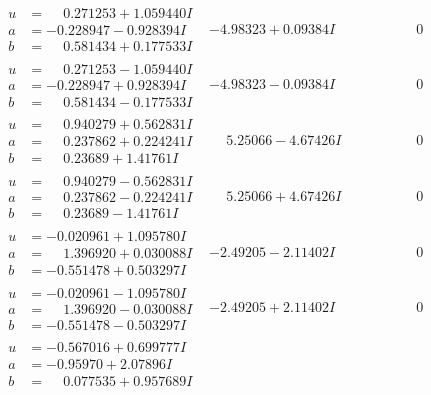 \documentclass[1p]{elsarticle_modified}
\theoremstyle{definition}
\begin{document}
$$\begin{array}{c|c|c}
\begin{aligned}
u &= \phantom{-}0.271253 + 1.059440 I \\
a &= -0.228947 - 0.928394 I \\
b &= \phantom{-}0.581434 + 0.177533 I\end{aligned}
 & -4.98323 + 0.09384 I & \phantom{-0.000000 } 0 \\ \hline\begin{aligned}
u &= \phantom{-}0.271253 - 1.059440 I \\
a &= -0.228947 + 0.928394 I \\
b &= \phantom{-}0.581434 - 0.177533 I\end{aligned}
 & -4.98323 - 0.09384 I & \phantom{-0.000000 } 0 \\ \hline\begin{aligned}
u &= \phantom{-}0.940279 + 0.562831 I \\
a &= \phantom{-}0.237862 + 0.224241 I \\
b &= \phantom{-}0.23689 + 1.41761 I\end{aligned}
 & \phantom{-}5.25066 - 4.67426 I & \phantom{-0.000000 } 0 \\ \hline\begin{aligned}
u &= \phantom{-}0.940279 - 0.562831 I \\
a &= \phantom{-}0.237862 - 0.224241 I \\
b &= \phantom{-}0.23689 - 1.41761 I\end{aligned}
 & \phantom{-}5.25066 + 4.67426 I & \phantom{-0.000000 } 0 \\ \hline\begin{aligned}
u &= -0.020961 + 1.095780 I \\
a &= \phantom{-}1.396920 + 0.030088 I \\
b &= -0.551478 + 0.503297 I\end{aligned}
 & -2.49205 - 2.11402 I & \phantom{-0.000000 } 0 \\ \hline\begin{aligned}
u &= -0.020961 - 1.095780 I \\
a &= \phantom{-}1.396920 - 0.030088 I \\
b &= -0.551478 - 0.503297 I\end{aligned}
 & -2.49205 + 2.11402 I & \phantom{-0.000000 } 0 \\ \hline\begin{aligned}
u &= -0.567016 + 0.699777 I \\
a &= -0.95970 + 2.07896 I \\
b &= \phantom{-}0.077535 + 0.957689 I\end{aligned}

\end{array}$$
\end{document}
